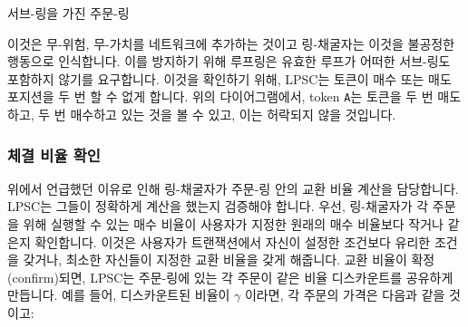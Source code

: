 \documentclass[UTF8,nofonts]{article}
\makeatletter
\newenvironment{figurehere}
 {\def\@captype{figure}}
 {}
\makeatother
\begin{document}
\begin{multicols}{2}
\begin{center}
\begin{figurehere}

\caption{서브-링을 가진 주문-링}
\label{fig:subring}
\end{figurehere}
\end{center}

이것은 무-위험, 무-가치를 네트워크에 추가하는 것이고 링-채굴자는 이것을 불공정한 행동으로 인식합니다. 이를 방지하기 위해 루프링은 유효한 루프가 어떠한 서브-링도 포함하지 않기를 요구합니다. 이것을 확인하기 위해, LPSC는 토큰이 매수 또는 매도 포지션을 두 번 할 수 없게 합니다. 위의 다이어그램에서, token \verb|A|는 토큰을 두 번 매도하고, 두 번 매수하고 있는 것을 볼 수 있고, 이는 허락되지 않을 것입니다.      


\subsubsection{체결 비율 확인\label{sec:fill_rate_check}}

위에서 언급했던 이유로 인해 링-채굴자가 주문-링 안의 교환 비율 계산을 담당합니다. LPSC는 그들이 정확하게 계산을 했는지 검증해야 합니다. 우선, 링-채굴자가 각 주문을 위해 실행할 수 있는 매수 비율이 사용자가 지정한 원래의 매수 비율보다 작거나 같은지 확인합니다. 이것은 사용자가 트랜잭션에서 자신이 설정한 조건보다 유리한 조건을 갖거나, 최소한 자신들이 지정한 교환 비율을 갖게 해줍니다. 교환 비율이 확정(confirm)되면, LPSC는 주문-링에 있는 각 주문이 같은 비율 디스카운트를 공유하게 만듭니다. 예를 들어, 디스카운트된 비율이 $\gamma$ 이라면, 각 주문의 가격은 다음과 같을 것이고:    


\end{multicols}
\end{document}

